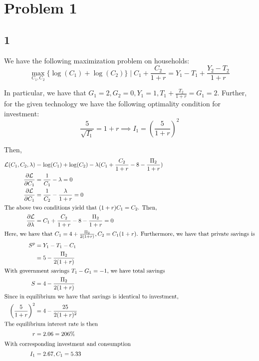 \documentclass[12pt,letterpaper]{article}
\theoremstyle{definition}
\begin{document}
\section*{Problem 1}

\subsection*{1}

We have the following maximization problem on households:
\[
  \max_{C_1, C_2}\{\log(C_1) + \log(C_2)\} \mid C_1 + \frac{C_2}{1 + r} = Y_1 -
  T_1 + \frac{Y_2 - T_2}{1 + r}
\]

In particular, we have that $G_1 = 2, G_2 = 0, Y_1 = 1, T_1 + \frac{T_2}{1 + r}
= G_1 = 2$. Further, for the given technology we have the following optimality
condition for investment:
\[
  \frac{5}{\sqrt{I_1}} = 1 + r \implies I_1 = \left(\frac{5}{1+r}\right)^2
\]

Then,
\begin{align*}
  \mathcal{L}(C_1, C_2, \lambda) &= \log(C_1) + \log(C_2) - \lambda(C_1 +
  \frac{C_2}{1+r} - 8 - \frac{\Pi_2}{1 + r}) \\
  \frac{\partial \mathcal{L}}{\partial C_1} &= \frac{1}{C_1} - \lambda = 0 \\
  \frac{\partial \mathcal{L}}{\partial C_1} &= \frac{1}{C_2} -
  \frac{\lambda}{1+r} = 0 \\ 
  \intertext{The above two conditions yield that $(1+r)C_1 = C_2$. Then, }
  \frac{\partial \mathcal{L}}{\partial \lambda} &= C_1 + \frac{C_2}{1 + r} - 8 -
  \frac{\Pi_2}{1+r} =  0 \\
  \intertext{Here, we have that $C_1 = 4 + \frac{\Pi_2}{2(1 + r)}, C_2 = C_1(1 + r)$. Furthermore, we have that private savings is}
  S^p &= Y_1 - T_1 - C_1 \\
                                 &= 5 - \frac{\Pi_2}{2(1 + r)} \\
  \intertext{With government savings $T_1 - G_1 = -1,$ we have total savings}
  S &= 4 - \frac{\Pi_2}{2(1+r)} \\
  \intertext{Since in equilibrium we have that savings is identical to investment,}
  \left(\frac{5}{1+r}\right)^2 &= 4 - \frac{25}{2(1+r)^2} \\
  \intertext{The equilibrium interest rate is then}
  r &= 2.06 = 206\% \\
  \intertext{With corresponding investment and consumption}
  I_1 &= 2.67, C_1 = 5.33
\end{align*}
\end{document}

